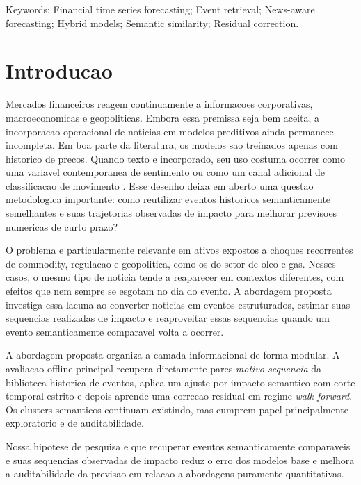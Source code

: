 \documentclass[12pt]{article}
\begin{document}
\begin{keywords}
Keywords: Financial time series forecasting; Event retrieval; News-aware forecasting; Hybrid models; Semantic similarity; Residual correction.
\end{keywords}

\section{Introducao}

Mercados financeiros reagem continuamente a informacoes corporativas, macroeconomicas e geopoliticas. Embora essa premissa seja bem aceita, a incorporacao operacional de noticias em modelos preditivos ainda permanece incompleta. Em boa parte da literatura, os modelos sao treinados apenas com historico de precos. Quando texto e incorporado, seu uso costuma ocorrer como uma variavel contemporanea de sentimento ou como um canal adicional de classificacao de movimento \cite{Tetlock:2007, Tetlock:2008, Xu:2018, Sawhney:2020}. Esse desenho deixa em aberto uma questao metodologica importante: como reutilizar eventos historicos semanticamente semelhantes e suas trajetorias observadas de impacto para melhorar previsoes numericas de curto prazo?

O problema e particularmente relevante em ativos expostos a choques recorrentes de commodity, regulacao e geopolitica, como os do setor de oleo e gas. Nesses casos, o mesmo tipo de noticia tende a reaparecer em contextos diferentes, com efeitos que nem sempre se esgotam no dia do evento. A abordagem proposta investiga essa lacuna ao converter noticias em eventos estruturados, estimar suas sequencias realizadas de impacto e reaproveitar essas sequencias quando um evento semanticamente comparavel volta a ocorrer.

A abordagem proposta organiza a camada informacional de forma modular. A avaliacao offline principal recupera diretamente pares \textit{motivo-sequencia} da biblioteca historica de eventos, aplica um ajuste por impacto semantico com corte temporal estrito e depois aprende uma correcao residual em regime \textit{walk-forward}. Os clusters semanticos continuam existindo, mas cumprem papel principalmente exploratorio e de auditabilidade.

Nossa hipotese de pesquisa e que recuperar eventos semanticamente comparaveis e suas sequencias observadas de impacto reduz o erro dos modelos base e melhora a auditabilidade da previsao em relacao a abordagens puramente quantitativas.
\end{document}
